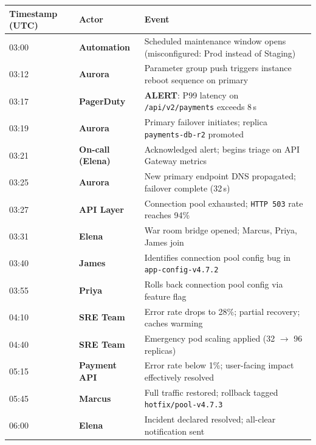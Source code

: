 \documentclass[11pt,a4paper]{article}
\begin{document}
\setlength{\parskip}{0pt}
\begin{tabularx}{\linewidth}{@{}
  >{\ttfamily\small\color{muted}}l
  @{\hspace{6mm}}
  >{\small\bfseries}l
  @{\hspace{4mm}}
  >{\small\raggedright\arraybackslash}X
  @{}}
\toprule
\normalfont\small\bfseries\color{ink}Timestamp (UTC) &
\normalfont\small\bfseries\color{ink}Actor &
\normalfont\small\bfseries\color{ink}Event \\
\midrule
03:00 & Automation     & Scheduled maintenance window opens (misconfigured: Prod instead of Staging)\\
03:12 & Aurora         & Parameter group push triggers instance reboot sequence on primary\\
03:17 & PagerDuty      & \textbf{\color{accent}ALERT}: P99 latency on \texttt{/api/v2/payments} exceeds 8\,s\\
03:19 & Aurora         & Primary failover initiates; replica \texttt{payments-db-r2} promoted\\
03:21 & On-call (Elena)& Acknowledged alert; begins triage on API Gateway metrics\\
03:25 & Aurora         & New primary endpoint DNS propagated; failover complete (32\,s)\\
03:27 & API Layer      & Connection pool exhausted; \texttt{HTTP 503} rate reaches 94\%\\
03:31 & Elena          & War room bridge opened; Marcus, Priya, James join\\
03:40 & James          & Identifies connection pool config bug in \texttt{app-config-v4.7.2}\\
03:55 & Priya          & Rolls back connection pool config via feature flag\\
04:10 & SRE Team       & Error rate drops to 28\%; partial recovery; caches warming\\
04:40 & SRE Team       & Emergency pod scaling applied (32 $\to$ 96 replicas)\\
05:15 & Payment API    & Error rate below 1\%; user-facing impact effectively resolved\\
05:45 & Marcus         & Full traffic restored; rollback tagged \texttt{hotfix/pool-v4.7.3}\\
06:00 & Elena          & Incident declared resolved; all-clear notification sent\\
\bottomrule
\end{tabularx}
\setlength{\parskip}{4pt plus 1pt}
\end{document}
